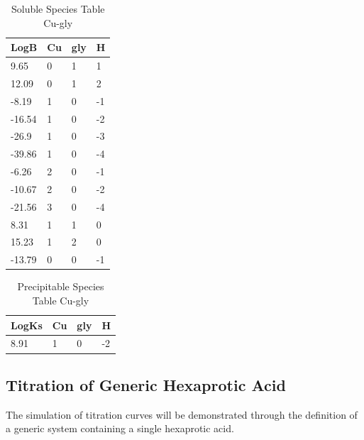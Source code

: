 \documentclass[a4paper, 12pt]{article}
\begin{document}
\begin{table}[h!]
\centering
\begin{tabular}{|l|l|l|l|}
\hline
    \textbf{LogB}   & \textbf{Cu} & \textbf{gly} & \textbf{H}  \\ \hline
    9.65   & 0  & 1   & 1  \\ \hline
    12.09  & 0  & 1   & 2  \\ \hline
    -8.19  & 1  & 0   & -1 \\ \hline
    -16.54 & 1  & 0   & -2 \\ \hline
    -26.9  & 1  & 0   & -3 \\ \hline
    -39.86 & 1  & 0   & -4 \\ \hline
    -6.26  & 2  & 0   & -1 \\ \hline
    -10.67 & 2  & 0   & -2 \\ \hline
    -21.56 & 3  & 0   & -4 \\ \hline
    8.31   & 1  & 1   & 0  \\ \hline
    15.23  & 1  & 2   & 0  \\ \hline
    -13.79 & 0  & 0   & -1 \\ \hline
\end{tabular}
\caption{Soluble Species Table Cu-gly}
\label{tab:species_cu_gly}
\end{table}

\begin{table}[h!]
\centering
\begin{tabular}{|l|l|l|l|}
\hline
    \textbf{LogKs} & \textbf{Cu} & \textbf{gly} & \textbf{H}  \\ \hline
    8.91  & 1  & 0   & -2 \\ \hline
\end{tabular}
\caption{Precipitable Species Table Cu-gly}
\label{tab:precipitate_cu_gly}
\end{table}


\subsection{Titration of Generic Hexaprotic Acid}
The simulation of titration curves will be demonstrated through the definition of a generic system containing a single hexaprotic acid.
\end{document}
